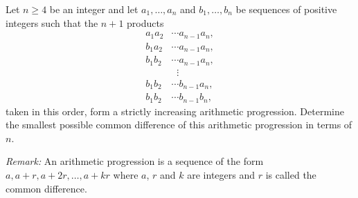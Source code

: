 Let $n \geq 4$ be an integer and let $a_1, \ldots, a_n$ and $b_1, \ldots, b_n$ be sequences
of positive integers such that the $n+1$ products
\begin{align*}
a_1a_2 & \cdots a_{n-1}a_n, \\
b_1a_2 & \cdots a_{n-1}a_n, \\
b_1b_2 & \cdots a_{n-1}a_n, \\
 & \; \; \vdots \\
b_1b_2 & \cdots b_{n-1}a_n, \\
b_1b_2 & \cdots b_{n-1}b_n,
\end{align*}
taken in this order, form a strictly increasing arithmetic progression.
Determine the smallest possible common difference of this arithmetic progression in terms of $n$.

\emph{Remark:} An arithmetic progression is a sequence of the form $a, a+r, a+2r, \ldots, a+kr$
where $a$, $r$ and $k$ are integers and $r$ is called the common difference.
